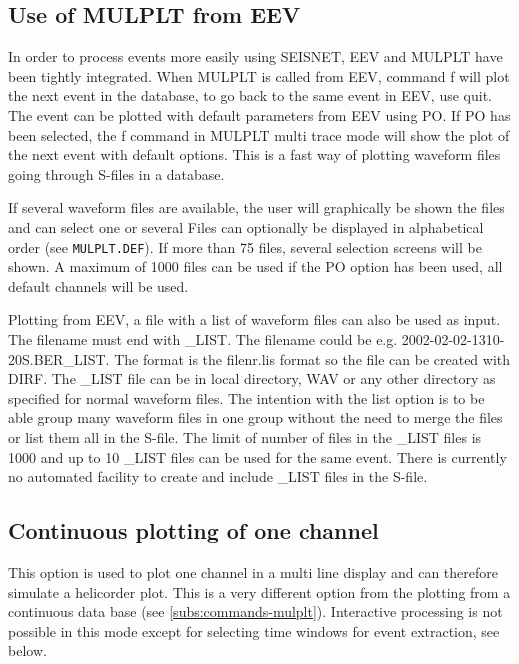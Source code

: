 \subsection{Use of MULPLT from EEV}

In order to process events more easily using SEISNET, EEV and MULPLT have been tightly integrated. When MULPLT is called from EEV, command f will plot the next event in the database, to go back to the same event in EEV, use quit. The event can be plotted with default parameters from EEV using PO. If PO has been selected, the f command in MULPLT multi trace mode will show the plot of the next event with default options. This is a fast way of plotting waveform files going through S-files in a database. 

If several waveform files are available, the user will graphically be shown the files and can select one or several Files can optionally be displayed in alphabetical order (see \texttt{MULPLT.DEF}). If more than 75 files, several selection screens will be shown. A maximum of 1000 files can be used if the PO option has been used, all default channels will be used. 

Plotting from EEV, a file with a list of waveform files can also be used as input. The filename must end with \_LIST.  The filename could be e.g. 2002-02-02-1310-20S.BER\_LIST. The format is the filenr.lis format so the file can be created with DIRF.  The \_LIST file can be in local directory, WAV or any other directory as specified for normal waveform files.  The intention with the list option is to be able group many waveform files in one group without the need to merge the files or list them all in the S-file. The limit of number of files in the \_LIST files is 1000 and up to 10 \_LIST files can be used for the same event. There is currently no automated facility to create and include \_LIST files in the S-file.

\subsection{Continuous plotting of one channel}

This option is used to plot one channel in a multi line display and can therefore simulate a helicorder plot. This is a very different option from the plotting from a continuous data base (see \ref{subs:commands-mulplt}).  Interactive processing is not possible in this mode except for selecting time windows for event extraction, see below. 

